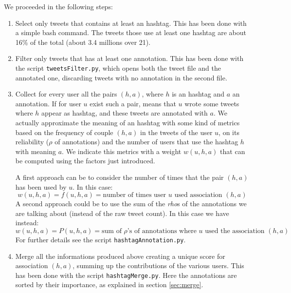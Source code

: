\documentclass[a4paper,11pt,oneside]{article}
\begin{document}
We proceeded in the following steps:

\begin{enumerate}
\item Select only tweets that contains at least an hashtag. This has been done with a simple bash command. The tweets those use at least one hashtag are about 16\% of the total (about 3.4 millions over 21).
\item Filter only tweets that has at least one annotation. This has been done with the script \texttt{tweetsFilter.py}, which opens both the tweet file and the annotated one, discarding tweets with no annotation in the second file.
\item Collect for every user all the pairs $(h,a)$, where $h$ is an hashtag and $a$ an annotation. If for user $u$ exist such a pair, means that $u$ wrote some tweets where $h$ appear as hashtag, and these tweets are annotated with $a$. 
We actually approximate the meaning of an hashtag with some kind of metrics based on the frequency of couple $(h,a)$ in the tweets of the user $u$, on its reliability ($\rho$ of annotations) and the number of users that use the hashtag $h$ with meaning $a$. We indicate this metrics with a weight $w(u,h,a)$ that can be computed using the factors just introduced.

A first approach can be to consider the number of times that the pair $(h,a)$ has been used by $u$. In this case:
\begin{equation}
w(u,h,a) = f(u,h,a) = \text{number of times user $u$ used association $(h,a)$}
\end{equation} 
A second approach could be to use the sum of the \textit{rho}s of the annotations we are talking about (instead of the raw tweet count). In this case we have instead:
\begin{equation}
w(u,h,a) = P(u,h,a) = \text{sum of $\rho$'s of annotations where $u$ used the association $(h,a)$}
\end{equation} 
For further details see the script \texttt{hashtagAnnotation.py}.
\item Merge all the informations produced above creating a unique score for association $(h,a)$, summing up the contributions of the various users. This has been done with the script \texttt{hashtagMerge.py}. Here the annotations are sorted by their importance, as explained in section \ref{sec:merge}.
\end{enumerate}
\end{document}
